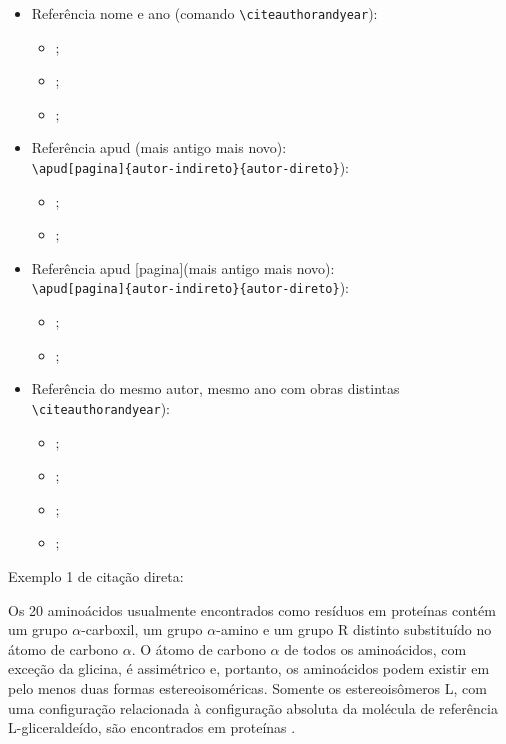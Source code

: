 \begin{itemize}
\begin{itemize}
		\item \cite{AgapitoTenfen2014, Baum2016, Nelson2014};
	\end{itemize}
	\item Referência nome e ano (comando \verb|\citeauthorandyear|):
	\begin{itemize}
		\item {};
		\item {};
		\item {};
	\end{itemize}
	\item Referência apud ({mais antigo} {mais novo}):\\
	\verb|\apud[pagina]{autor-indireto}{autor-direto}|):
	\begin{itemize}
		\item {};
		\item {};
	\end{itemize}
	\item Referência apud [pagina]({mais antigo} {mais novo}):\\
	\verb|\apud[pagina]{autor-indireto}{autor-direto}|):
	\begin{itemize}
		\item {};
		\item {};
	\end{itemize}
	
	\item Referência do mesmo autor, mesmo ano com obras distintas 
	\verb|\citeauthorandyear|):
	\begin{itemize}
		\item {};
		\item {};
		\item \cite{Agaisse1996a};
		\item \cite{Agaisse1996b};
	\end{itemize}
	
	
\end{itemize}


Exemplo 1 de citação direta:

\begin{citacao}
	Os 20 aminoácidos usualmente encontrados como resíduos em proteínas contém um grupo $\alpha$-carboxil, um grupo $\alpha$-amino e um grupo R distinto substituído no átomo de carbono $\alpha$. O átomo de carbono $\alpha$ de todos os aminoácidos, com exceção da glicina, é assimétrico e, portanto, os aminoácidos podem existir em pelo menos duas formas estereoisoméricas. Somente os estereoisômeros L, com uma configuração relacionada à configuração absoluta da molécula de referência L-gliceraldeído, são encontrados em proteínas \cite[p. 81]{Nelson2014}.
\end{citacao}

